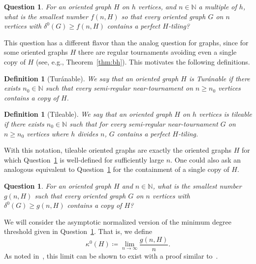 \documentclass[11pt]{amsart}
\newtheorem{question}[theorem]{Question}
\newtheorem{definition}[theorem]{Definition}
\def\N{\mathbb{N}}
\begin{document}
\begin{question}\label{quest:min_degree_tiling}
    For an oriented graph $H$ on $h$ vertices, and $n \in \N$ a multiple of $h$, what is the smallest number $f(n, H)$ so that every oriented graph $G$ on $n$ vertices with $\delta^0(G) \ge f(n,H)$ contains a perfect $H$-tiling?
\end{question}

This question has a different flavor than the analog question for graphs, since for some oriented graphs $H$ there are regular tournaments avoiding even a single copy of $H$ (see, e.g., Theorem~\ref{thm:bh}).
This motivates the following definitions.

\begin{definition}[Tur\'anable] \rm
    We say that an oriented graph $H$ is \emph{Tur\'anable} if there exists $n_0 \in \N$ such that every semi-regular near-tournament on $n \ge n_0$ vertices contains a copy of $H$.
\end{definition}

\begin{definition}[Tileable] \rm
    We say that an oriented graph $H$ on $h$ vertices is \emph{tileable} if there exists $n_0 \in \N$ such that for every semi-regular near-tournament $G$ on $n \ge n_0$ vertices where $h$ divides $n$, $G$ contains a perfect $H$-tiling.
\end{definition}

With this notation, tileable oriented graphs are exactly the oriented graphs $H$ for which Question~\ref{quest:min_degree_tiling} is well-defined for sufficiently large $n$.
One could also ask an analogous equivalent to Question~\ref{quest:min_degree_tiling} for the containment of a single copy of $H$. 

\begin{question}\label{quest:min_degree_turan}
    For an oriented graph $H$ and $n \in \N$, what is the smallest number $g(n, H)$ such that every oriented graph $G$ on $n$ vertices with $\delta^0(G) \ge g(n,H)$ contains a copy of $H$?
\end{question}

We will consider the asymptotic normalized version of the minimum degree threshold given in Question~\ref{quest:min_degree_turan}. That is, we define 
\begin{equation} \label{eq:kappa}
    \kappa^0(H) \coloneqq \lim_{n \to \infty} \frac{g(n,H)}{n} .
\end{equation}
As noted in~\cite{DHLMPT}, this limit can be shown to exist with a proof similar to~\cite[Proposition 1.2]{mubayi-zhao}.
\end{document}
